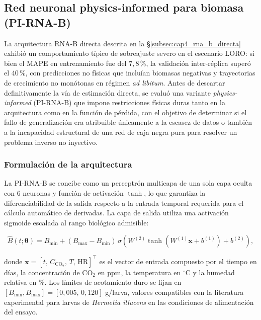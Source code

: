 \subsection{Red neuronal physics-informed para biomasa (PI-RNA-B)}
\label{subsec:cap4_pi_rna_b}

La arquitectura RNA-B directa descrita en la \S\ref{subsec:cap4_rna_b_directa} exhibió un comportamiento típico de sobreajuste severo en el escenario LORO: si bien el MAPE en entrenamiento fue del $7{,}8\,$\%, la validación inter-réplica superó el $40\,$\%, con predicciones no físicas que incluían biomasas negativas y trayectorias de crecimiento no monótonas en régimen \textit{ad libitum}. Antes de descartar definitivamente la vía de estimación directa, se evaluó una variante \textit{physics-informed} (PI-RNA-B) que impone restricciones físicas duras tanto en la arquitectura como en la función de pérdida, con el objetivo de determinar si el fallo de generalización era atribuible únicamente a la escasez de datos o también a la incapacidad estructural de una red de caja negra pura para resolver un problema inverso no inyectivo.

\subsubsection*{Formulación de la arquitectura}

La PI-RNA-B se concibe como un perceptrón multicapa de una sola capa oculta con 6 neuronas y función de activación $\tanh$, lo que garantiza la diferenciabilidad de la salida respecto a la entrada temporal requerida para el cálculo automático de derivadas. La capa de salida utiliza una activación sigmoide escalada al rango biológico admisible:

\begin{equation}
\hat{B}(t;\boldsymbol{\theta}) = B_{\min} + (B_{\max}-B_{\min})\,\sigma\!\left(W^{(2)}\tanh\!\left(W^{(1)}\mathbf{x}+b^{(1)}\right)+b^{(2)}\right),
\label{eq:cap4_pi_rna_salida}
\end{equation}

donde $\mathbf{x}=[t,\,C_{\mathrm{CO}_2},\,T,\,\mathrm{HR}]^{\top}$ es el vector de entrada compuesto por el tiempo en días, la concentración de CO$_2$ en ppm, la temperatura en $^{\circ}$C y la humedad relativa en \%. Los límites de acotamiento duro se fijan en $[B_{\min},B_{\max}]=[0{,}005,\,0{,}120]$ g/larva, valores compatibles con la literatura experimental para larvas de \textit{Hermetia illucens} en las condiciones de alimentación del ensayo.

